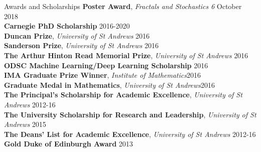 \documentclass{resume} %
\begin{document}
\begin{rSection}{Awards and Scholarships} \itemsep -3pt     
\textbf{Poster Award}, \emph{Fractals and Stochastics 6} \hfill October 2018 \\   
\textbf{Carnegie PhD Scholarship} \hfill 2016-2020 \\
\textbf{Duncan Prize}, \emph{University of St Andrews} \hfill {2016} \\
\textbf{Sanderson Prize}, \emph{University of St Andrews} \hfill {2016} \\
\textbf{The Arthur Hinton Read Memorial Prize}, \emph{University of St Andrews} \hfill {2016}\\
\textbf{ODSC Machine Learning/Deep Learning Scholarship} \hfill {2016}\\
\textbf{IMA Graduate Prize Winner}, \emph{Institute of Mathematics}\hfill {2016}\\
\textbf{Graduate Medal in Mathematics}, \emph{University of St Andrews}\hfill {2016}\\
\textbf{The Principal's Scholarship for Academic Excellence}, \emph{University of St Andrews} \hfill {2012-16} \\
\textbf{The University Scholarship for Research and Leadership}, \emph{University of St Andrews} \hfill {2015}\\
\textbf{The Deans' List for Academic Excellence}, \emph{University of St Andrews} \hfill {2012-16}\\
\textbf{Gold Duke of Edinburgh Award} \hfill {2013}
\end{rSection}
\end{document}
